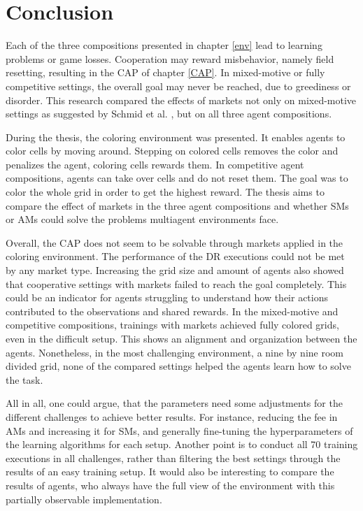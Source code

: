 \chapter{Conclusion}\label{sec:Conclusion}
Each of the three compositions presented in chapter \ref{env} lead to learning problems or game losses. Cooperation may reward misbehavior, namely field resetting, resulting in the CAP of chapter \ref{CAP}. In mixed-motive or fully competitive settings, the overall goal may never be reached, due to greediness or disorder. This research compared the effects of markets not only on mixed-motive settings as suggested by Schmid et al. \cite{scbe21}, but on all three agent compositions.

During the thesis, the coloring environment was presented. It enables agents to color cells by moving around. Stepping on colored cells removes the color and penalizes the agent, coloring cells rewards them. In competitive agent compositions, agents can take over cells and do not reset them. The goal was to color the whole grid in order to get the highest reward. The thesis aims to compare the effect of markets in the three agent compositions and whether SMs or AMs could solve the problems multiagent environments face.

Overall, the CAP does not seem to be solvable through markets applied in the coloring environment. The performance of the DR executions could not be met by any market type. Increasing the grid size and amount of agents also showed that cooperative settings with markets failed to reach the goal completely. This could be an indicator for agents struggling to understand how their actions contributed to the observations and shared rewards. In the mixed-motive and competitive compositions, trainings with markets achieved fully colored grids, even in the difficult setup. This shows an alignment and organization between the agents. Nonetheless, in the most challenging environment, a nine by nine room divided grid, none of the compared settings helped the agents learn how to solve the task.

All in all, one could argue, that the parameters need some adjustments for the different challenges to achieve better results. For instance, reducing the fee in AMs and increasing it for SMs, and generally fine-tuning the hyperparameters of the learning algorithms for each setup. Another point is to conduct all 70 training executions in all challenges, rather than filtering the best settings through the results of an easy training setup. It would also be interesting to compare the results of agents, who always have the full view of the environment with this partially observable implementation.

